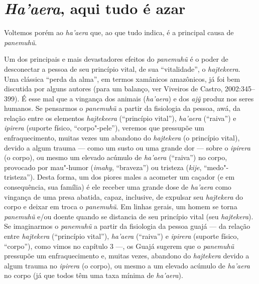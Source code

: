 \section{\emph{Ha'aera}, aqui tudo é azar}

Voltemos porém ao \emph{ha'aera} que, ao que tudo indica, é a principal
causa de \emph{panemuhũ}.

Um dos principais e mais devastadores efeitos do \emph{panemuhũ} é o
poder de desconectar a pessoa de seu princípio vital, de sua
``vitalidade'', o \emph{hajtekeera}. Uma clássica ``perda da alma'', em
termos xamânicos amazônicos, já foi bem discutida por alguns autores
(para um balanço, ver Viveiros de Castro, 2002:345--399). É esse mal que
a vingança dos animais (\emph{ha'aera}) e dos \emph{ajỹ} produz nos
seres humanos. Se pensarmos o \emph{panemuhũ} a partir da fisiologia da
pessoa, awá, da relação entre os elementos \emph{hajtekeera}
(``princípio vital''), \emph{ha'aera} (``raiva'') e \emph{ipirera}
(suporte físico, ``corpo"-pele''), veremos que pressupõe um
enfraquecimento, muitas vezes um abandono do \emph{hajtekera} (o
princípio vital), devido a algum trauma --- como um susto ou uma grande
dor --- sobre o \emph{ipirera} (o corpo), ou mesmo um elevado acúmulo de
\emph{ha'aera} (``raiva'') no corpo, provocado por mau"-humor
(\emph{imahy}, ``braveza'') ou tristeza (\emph{kije},
``medo"-tristeza''). Desta forma, um dos piores males a acometer um
caçador (e em consequência, sua família) é ele receber uma grande dose
de \emph{ha'aera} como vingança de uma presa abatida, capaz, inclusive,
de expulsar seu \emph{hajtekera} do corpo e deixar em troca o
\emph{panemuhũ}. Em linhas gerais, um homem se torna \emph{panemuhũ}
e/ou doente quando se distancia de seu princípio vital (seu
\emph{hajtekera}). Se imaginarmos o \emph{panemuhũ} a partir da
fisiologia da pessoa guajá --- da relação entre \emph{hajtekera}
(``princípio vital''), \emph{ha'aera} (``raiva'') e \emph{ipirera} (suporte
físico, ``corpo''), como vimos no capítulo 3 ---, os Guajá sugerem que o
\emph{panemuhũ} pressupõe um enfraquecimento e, muitas vezes, abandono
do \emph{hajtekera} devido a algum trauma no \emph{ipirera} (o corpo),
ou mesmo a um elevado acúmulo de \emph{ha'aera} no corpo (já que todos
têm uma taxa mínima de \emph{ha'aera}).

